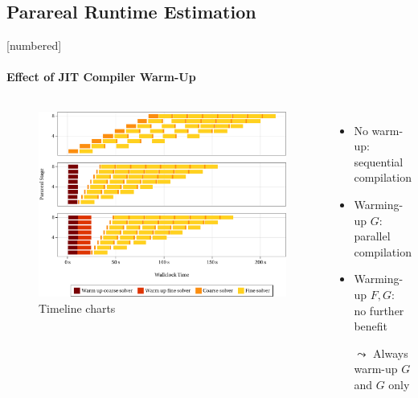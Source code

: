 \subsection{Parareal Runtime Estimation}
\begin{frame}[fragile]{\secname}
  [numbered]
  \framesubtitle{Effect of JIT Compiler Warm-Up}
  \begin{columns}
    \begin{figure}
    \includegraphics[width=\textwidth]{figures/fig_impl_warmup1.pdf}%
    \renewcommand\thefigure{7.1} %
    \caption{Timeline charts}
    \end{figure}
    \begin{itemize}
      \item
        No warm-up:\\ sequential compilation
        \vspace{2.4em}
      \item
        Warming-up $G$:\\ parallel compilation
        \vspace{2.4em}
      \item
        Warming-up $F,G$:\\ no further benefit
        \vspace{2.4em}
      \pause
      \item[$\leadsto$]
        Always warm-up $G$\\ and $G$ only
    \end{itemize}
    \vspace{2em}
  \end{columns}
\end{frame}

